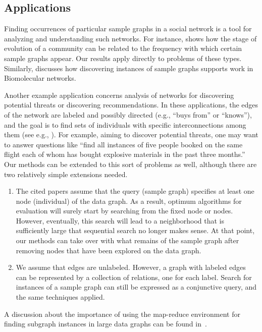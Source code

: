 \subsection{Applications}
\label{apps-subsect}

Finding occurrences of particular sample graphs in a social network is a tool for analyzing and understanding such networks. For instance, \cite{Leskovec} shows how the stage of evolution of a community can be related to the frequency with which certain sample graphs appear. Our results apply directly to problems of these types. Similarly, \cite{AlonDHHS08} discusses how discovering instances of sample graphs supports work in Biomolecular networks.


Another example application concerns analysis of networks for discovering potential threats or discovering recommendations. In these applications, the edges of the network are labeled and possibly directed (e.g., ``buys from'' or ``knows''), and the goal is to find sets of individuals with specific interconnections among them (see e.g., \cite{VS-COSI,VS-Budgeting}). For example, aiming to discover potential threats, one may want to answer questions like ``find all instances of five people booked on the same flight each of whom has bought explosive materials in the past three months.'' Our methods can be extended to this sort of problems as well, although there are two relatively simple extensions needed.

\begin{enumerate}
\item The cited papers assume that the query (sample graph) specifies at least one node (individual) of the data graph.  As a result, optimum algorithms for evaluation will surely start by searching from the fixed node or nodes.  However, eventually, this search will lead to a neighborhood that is sufficiently large that sequential search no longer makes sense.  At that point, our methods can take over with what remains of the sample graph after removing nodes that have been explored on the data graph.

\item We assume that edges are unlabeled.  However, a graph with labeled edges can be represented by a collection of relations, one for each label.  Search for instances of a sample graph can still be expressed as a conjunctive query, and the same techniques applied.
\end{enumerate}

A discussion about the importance of using the map-reduce environment for finding subgraph instances in large data graphs can be found in~\cite{Cohen09}.


